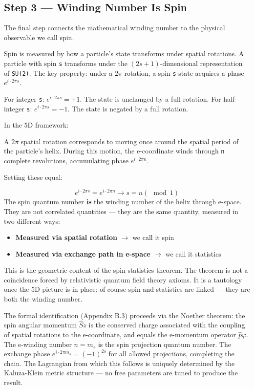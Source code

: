 \documentclass[aps,prd,preprint,superscriptaddress,longbibliography,floatfix]{revtex4-2}
\theoremstyle{remark}
\begin{document}
\subsection{Step 3 --- Winding Number Is Spin}

The final step connects the mathematical winding number to the physical observable we call spin.

Spin is measured by how a particle's state transforms under spatial rotations. A particle with spin \texttt{s} transforms under the $(2s+1)$-dimensional representation of \texttt{SU(2)}. The key property: under a $2\pi$ rotation, a spin-\texttt{s} state acquires a phase $e^{i\cdot2\pi s}$.

For integer \texttt{s}: $e^{i\cdot2\pi s} = +1$. The state is unchanged by a full rotation. For half-integer \texttt{s}: $e^{i\cdot2\pi s} = -1$. The state is negated by a full rotation.

In the 5D framework:

A $2\pi$ spatial rotation corresponds to moving once around the spatial period of the particle's helix. During this motion, the e-coordinate winds through \texttt{n} complete revolutions, accumulating phase $e^{i\cdot2\pi n}$.

Setting these equal:


\begin{equation}
    e^{i\cdot2\pi s} = e^{i\cdot2\pi n}  \to  s = n  (\mod 1)
\end{equation}
The spin quantum number \textbf{is} the winding number of the helix through e-space. They are not correlated quantities --- they are the same quantity, measured in two different ways:


\begin{itemize}
  \item \textbf{Measured via spatial rotation} $\to$ we call it spin
  \item \textbf{Measured via exchange path in e-space} $\to$ we call it statistics
\end{itemize}

This is the geometric content of the spin-statistics theorem. The theorem is not a coincidence forced by relativistic quantum field theory axioms. It is a tautology once the 5D picture is in place: of course spin and statistics are linked --- they are both the winding number.

The formal identification (Appendix B.3) proceeds via the Noether theorem: the spin angular momentum $\hat{S}z$ is the conserved charge associated with the coupling of spatial rotations to the e-coordinate, and equals the e-momentum operator $\hat{p}\varphi$. The e-winding number $n = m_{s}$ is the spin projection quantum number. The exchange phase $e^{i\cdot2\pi m_{s}} = (-1)^{2s}$ for all allowed projections, completing the chain. The Lagrangian from which this follows is uniquely determined by the Kaluza-Klein metric structure --- no free parameters are tuned to produce the result.
\end{document}
